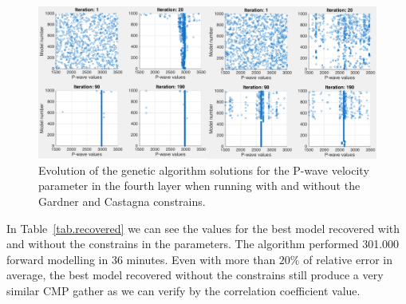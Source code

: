 \documentclass{vie16}
\begin{document}
\begin{figure}[H]
\centering
\includegraphics[scale=0.32]{iterations_vp4_refeita}
\caption{Evolution of the genetic algorithm solutions for the P-wave 
velocity parameter in the fourth layer when running with and without the 
Gardner and Castagna constrains.}
\label{fig2}
\end{figure}

In Table~\ref{tab.recovered} we can see the values for the best model 
recovered with and without the constrains in the parameters. The algorithm 
performed 301.000 forward modelling in 36 minutes. Even with more than 
$20\%$ of relative error in average, the best model recovered without the 
constrains still produce a very similar CMP gather as we can verify by the 
correlation coefficient value.
\end{document}
